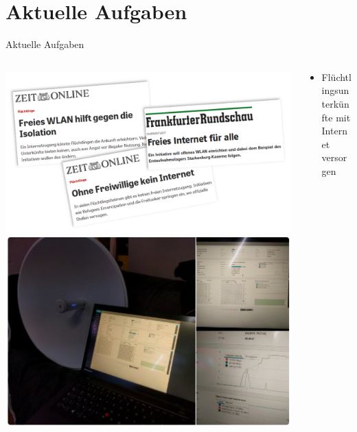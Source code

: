 \documentclass[10pt]{beamer}
\begin{document}
  \section{Aktuelle Aufgaben}

    \begin{frame}{Aktuelle Aufgaben}
      \begin{columns}[T]
        \begin{column}{5cm}
          \includegraphics[width=\textwidth]{images/2015-10_presse-fluechtlinge}
          \vspace{1em}
          \includegraphics[width=\textwidth]{images/powerbeam-mit-laptop}
        \end{column}
        \begin{column}{7cm}
        \begin{itemize}
          \item \large Flüchtlingsunterkünfte mit Internet versorgen\\

\end{itemize}
\end{column}
\end{columns}
\end{frame}
\end{document}

